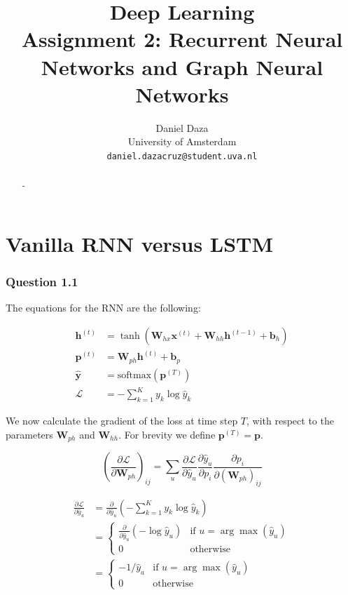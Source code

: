 \documentclass{article}
\title{Deep Learning\\Assignment 2: Recurrent Neural Networks and Graph Neural Networks}
\author{%
  Daniel Daza\\
  University of Amsterdam\\
  \texttt{daniel.dazacruz@student.uva.nl} \\
}
\newcommand{\pd}[2]{\frac{\partial #1}{\partial #2}}
\begin{document}

\maketitle

\begin{abstract}
-
\end{abstract}

\section{Vanilla RNN versus LSTM}

\subsubsection*{Question 1.1}

The equations for the RNN are the following:

\begin{align}
\mathbf{h}^{(t)} &= \tanh(\mathbf{W}_{hx}\mathbf{x}^{(t)} + \mathbf{W}_{hh}\mathbf{h}^{(t-1)} + \mathbf{b}_h) \label{eq:rnn1}\\
\mathbf{p}^{(t)} &= \mathbf{W}_{ph}\mathbf{h}^{(t)} + \mathbf{b}_p\\
\hat{\mathbf{y}} &= \text{softmax}(\mathbf{p}^{(T)}) \\
\mathcal{L} &= -\sum_{k=1}^K y_{k} \log\hat{y}_k \label{eq:rnn2}
\end{align}

We now calculate the gradient of the loss at time step $T$, with respect to the parameters $\mathbf{W}_{ph}$ and $\mathbf{W}_{hh}$. For brevity we define $\mathbf{p}^{(T)} = \mathbf{p}$.

\begin{equation}
\left(\pd{\mathcal{L}}{\mathbf{W}_{ph}}\right)_{ij} = \sum_u\pd{\mathcal{L}}{\hat{y}_u}\pd{\hat{y}_u}{p_i}\pd{p_i}{(\mathbf{W}_{ph})_{ij}}
\label{eq:dWph}
\end{equation}

\begin{align*}
\pd{\mathcal{L}}{\hat{y}_u} &= \pd{}{\hat{y}_u}\left(-\sum_{k=1}^K y_{k} \log\hat{y}_k\right) \\
&=
\left\lbrace
\begin{matrix}
\pd{}{\hat{y}_u}(-\log \hat{y}_u) & \text{if } u = \arg\max(\hat{y}_u) \\
0 & \text{otherwise}
\end{matrix}
\right.\\
&=
\left\lbrace
\begin{matrix}
-1/\hat{y}_a & \text{if } u = \arg\max(\hat{y}_u) \\
0 & \text{otherwise}
\end{matrix}
\right.
\end{align*}
\end{document}
